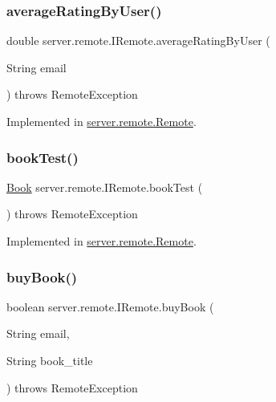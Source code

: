 \subsubsection{\texorpdfstring{average\+Rating\+By\+User()}{averageRatingByUser()}}
{\footnotesize\ttfamily double server.\+remote.\+I\+Remote.\+average\+Rating\+By\+User (\begin{DoxyParamCaption}\item[{String}]{email }\end{DoxyParamCaption}) throws Remote\+Exception}



Implemented in \hyperlink{classserver_1_1remote_1_1_remote_a67fc7aeeb889a80cda6e1a5f83858c2a}{server.\+remote.\+Remote}.

\mbox{\label{interfaceserver_1_1remote_1_1_i_remote_a7d561f9f92fb53177f2d3e49e445148a}} 
\subsubsection{\texorpdfstring{book\+Test()}{bookTest()}}
{\footnotesize\ttfamily \hyperlink{classserver_1_1data_1_1_book}{Book} server.\+remote.\+I\+Remote.\+book\+Test (\begin{DoxyParamCaption}{ }\end{DoxyParamCaption}) throws Remote\+Exception}



Implemented in \hyperlink{classserver_1_1remote_1_1_remote_a38bce20fa59064fe8d970164d6155435}{server.\+remote.\+Remote}.

\mbox{\label{interfaceserver_1_1remote_1_1_i_remote_a5ecb918e7d2650346770f3ff5676c25b}} 
\subsubsection{\texorpdfstring{buy\+Book()}{buyBook()}}
{\footnotesize\ttfamily boolean server.\+remote.\+I\+Remote.\+buy\+Book (\begin{DoxyParamCaption}\item[{String}]{email,  }\item[{String}]{book\+\_\+title }\end{DoxyParamCaption}) throws Remote\+Exception}




